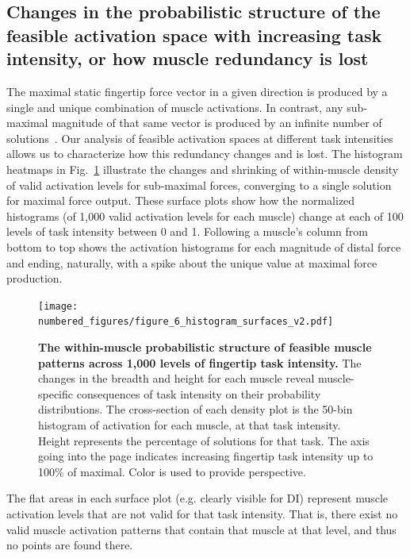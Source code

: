 \documentclass[9pt,twocolumn,twoside,lineno]{pnas-new}
\begin{document}
\subsection*{Changes in the probabilistic structure of the feasible activation space with increasing task intensity, or how muscle redundancy is lost}
The maximal static fingertip force vector in a given direction is produced by a single and unique combination of muscle activations. In contrast, any sub-maximal magnitude of that same vector is produced by an infinite number of solutions~\cite{spoor1983balancing,Chao1978Graphical,valero-cuevas2015fundamentals,Valero-Cuevas2000Predictive}.
Our analysis of feasible activation spaces at different task intensities allows us to characterize how this redundancy changes and is lost.
The histogram heatmaps in Fig.~\ref{fig:figure_6_histogram_heatmap} illustrate the changes and shrinking of within-muscle density of valid activation levels for sub-maximal forces, converging to a single solution for maximal force output. These surface plots show how the normalized histograms (of 1,000 valid activation levels for each muscle) change at each of 100 levels of task intensity between 0 and 1. Following a muscle’s column from bottom to top shows the activation histograms for each magnitude of distal force and ending, naturally, with a spike about the unique value at maximal force production.

\begin{figure}[htb]
\centering
\texttt{[image: numbered\_figures/figure\_6\_histogram\_surfaces\_v2.pdf]}
\caption{\textbf{The within-muscle probabilistic structure of feasible muscle patterns across 1,000 levels of fingertip task intensity.} The changes in the breadth and height for each muscle reveal muscle-specific consequences of task intensity on their probability distributions. The cross-section of each density plot is the 50-bin histogram of activation for each muscle, at that task intensity. Height represents the percentage of solutions for that task. The axis going into the page indicates increasing fingertip task intensity up to 100\% of maximal. Color is used to provide perspective.}
\label{fig:figure_6_histogram_heatmap}
\end{figure}


The flat areas in each surface plot (e.g. clearly visible for DI) represent muscle activation levels that are not valid for that task intensity. That is, there exist no valid muscle activation patterns that contain that muscle at that level, and thus no points are found there.
\end{document}
